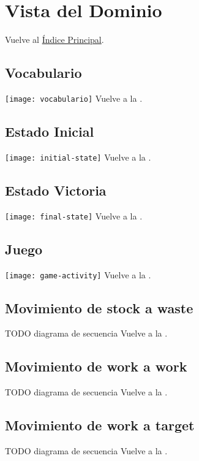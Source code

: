 \newpage{}
\section{Vista del Dominio}\label{domaintoc}

\secttoc
Vuelve al \hyperlink{toc}{Índice Principal}.

\newpage{}
\subsection{Vocabulario}
\texttt{[image: vocabulario]}
Vuelve a la .

\newpage{}
\subsection{Estado Inicial}
\texttt{[image: initial-state]}
Vuelve a la .

\newpage{}
\subsection{Estado Victoria}
\texttt{[image: final-state]}
Vuelve a la .

\newpage{}
\subsection{Juego}
\texttt{[image: game-activity]}
Vuelve a la .

\newpage{}
\subsection{Movimiento de stock a waste}
TODO diagrama de secuencia
Vuelve a la .

\newpage{}
\subsection{Movimiento de work a work}
TODO diagrama de secuencia
Vuelve a la .

\newpage{}
\subsection{Movimiento de work a target}
TODO diagrama de secuencia
Vuelve a la .
